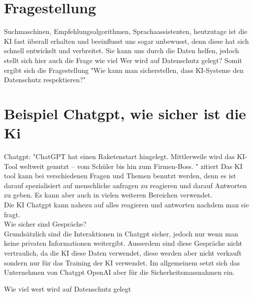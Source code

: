 \documentclass{article}
\begin{document}
    \section{Fragestellung}
    Suchmaschinen, Empfehlungsalgorithmen, Sprachaassistenten, heutzutage ist die KI fast überall erhalten und beeinflusst uns sogar unbewusst, denn diese hat sich schnell entwickelt und verbreitet. 
    Sie kann uns durch die Daten helfen, jedoch stellt sich hier auch die Frage wie viel Wer wird auf Datenschutz gelegt? 
    Somit ergibt sich die Fragestellung "Wie kann man sicherstellen, dass KI-Systeme den Datenschutz respektieren?"
\\


\section{Beispiel Chatgpt, wie sicher ist die Ki}
    Chatgpt: "ChatGPT hat einen Raketenstart hingelegt. Mittlerweile wird das KI-Tool weltweit genutzt – vom Schüler bis hin zum Firmen-Boss. " zitiert 
    Das KI tool kann bei verschiedenen Fragen und Themen benutzt werden, denn es ist darauf spezialisiert auf menschliche anfragen zu reagieren und darauf Antworten zu geben. 
    Es kann aber auch in vielen weiteren Bereichen verwendet.\\
    Die KI Chatgpt kann nahezu auf alles reagieren und antworten nachdem man sie fragt. 
\\
    Wie sicher sind Gespräche? \\
    Grundsätzlich sind die Interaktionen in Chatgpt sicher, jedoch nur wenn man keine privaten Informationen weitergibt. Ausserdem sind diese Gespräche nicht vertraulich, da die KI diese Daten verwendet, diese werden aber nicht verkauft sondern nur für das Training der KI verwendet. 
    Im allgemeinem setzt sich das Unternehmen von Chatgpt OpenAI aber für die Sicherheitsmassnahmen ein.

    Wie viel wert wird auf Datenschutz gelegt
    



\printbibliography
\end{document}
